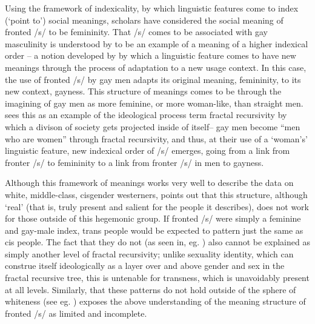 \documentclass[11pt]{article}
\begin{document}
Using the framework of indexicality, by which linguistic features come to index (`point to') social meanings, scholars have considered the social meaning of fronted /s/ to be femininity. That /s/ comes to be associated with gay masculinity is understood by \textcite{calder_sissy_2019} to be an example of a meaning of a higher indexical order -- a notion developed by \textcite{silverstein_indexical_2003} by which a linguistic feature comes to have new meanings through the process of adaptation to a new usage context. In this case, the use of fronted /s/ by gay men adapts its original meaning, femininity, to its new context, gayness. This structure of meanings comes to be through the imagining of gay men as more feminine, or more woman-like, than straight men. \textcite{calder_sissy_2019} sees this as an example of the ideological process \textcite{irvine_language_2000} term fractal recursivity by which a divison of society gets projected inside of itself-- gay men become ``men who are women'' through fractal recursivity, and thus, at their use of a `woman's' linguistic feature, new indexical order of /s/ emerges, going from a link from fronter /s/ to femininity to a link from fronter /s/ in men to gayness.

Although this framework of meanings works very well to describe the data on white, middle-class, cisgender westerners,  \textcite{calder_whose_2021}  points out that this structure, although `real' (that is, truly present and salient for the people it describes), does not work for those outside of this hegemonic group. If fronted /s/ were simply a feminine and gay-male index, trans people would be expected to pattern just the same as cis people. The fact that they do not (as seen in, eg. \cite{hazenberg_language_2012, podesva_sexuality_2015, zimman_hegemonic_2013}) also cannot be explained as simply another level of fractal recursivity; unlike sexuality identity, which can construe itself ideologically as a layer over and above gender and sex in the fractal recursive tree, this is untenable for transness, which is unavoidably present at all levels. Similarly, that these patterns do not hold outside of the sphere of whiteness (see eg. \cite{calder_whose_2022, jessee_cisgender_2025, maegaard_s_2015}) exposes the above understanding of the meaning structure of fronted /s/ as limited and incomplete. 
\end{document}
